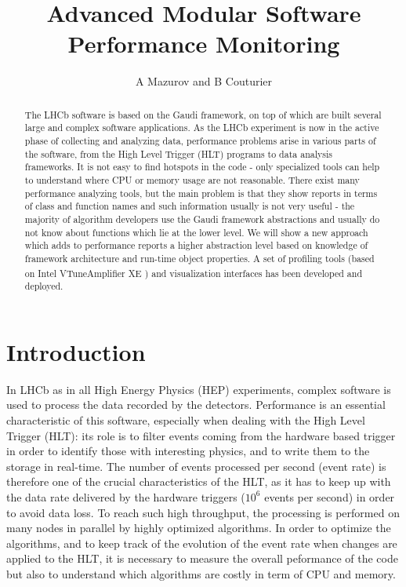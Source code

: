 \documentclass[a4paper]{jpconf}
\begin{document}
\linenumbers
\title{Advanced Modular Software Performance Monitoring}
\author{A Mazurov and B Couturier}

\address{ CERN, European Organization for Nuclear Research, Geneva, Switzerland}
\address{ University of Ferrara, Ferrara, Italy}
\address{ Institute for Nuclear Research, Troitsk, Russia}




\newcommand\iamp{{Intel\textsuperscript{\textregistered} VTune\texttrademark Amplifier XE} }
\newcommand\amp{{VTune\texttrademark Amplifier XE} }
\newcommand\intel{{Intel\textsuperscript{\textregistered}} }

\begin{abstract}
The LHCb software is based on the Gaudi framework, on top of which are built several large and complex software applications. As the LHCb experiment is now in the active phase of collecting and analyzing data,  performance problems arise in various parts of the software, from the High Level Trigger (HLT) programs to data analysis frameworks. It is not easy to find hotspots in the code - only specialized tools can help to understand where CPU or memory usage are not reasonable. There exist many performance analyzing tools, but the main problem is that they show reports in terms of class and function names and such information usually is not very useful - the majority of algorithm developers use the Gaudi framework abstractions and usually do not know about functions which lie at the lower level. We will show a new approach which adds to performance reports a higher abstraction level based on knowledge of framework architecture and run-time object properties. A set of profiling tools (based on \iamp) and visualization interfaces has been developed and deployed.
\end{abstract}

\section{Introduction}
In LHCb as in all High Energy Physics (HEP) experiments, complex software is used to process the data recorded by the detectors. Performance is an essential characteristic of this software, especially when dealing with the High Level Trigger (HLT): its role is to filter events coming from the hardware based trigger in order to identify those with interesting physics, and to write them to the storage in real-time. The number of events processed per second (event rate) is therefore one of the crucial characteristics of the HLT, as it has to keep up with the data rate delivered by the hardware triggers ($10^6$ events per second) in order to avoid data loss. To reach such high throughput, the processing is performed on many nodes in parallel by highly optimized algorithms. In order to optimize the algorithms, and to keep track of the evolution of the event rate when changes are applied to the HLT, it is necessary to measure the overall peformance of the code but also to understand which algorithms are costly in term of CPU and memory.
\end{document}

